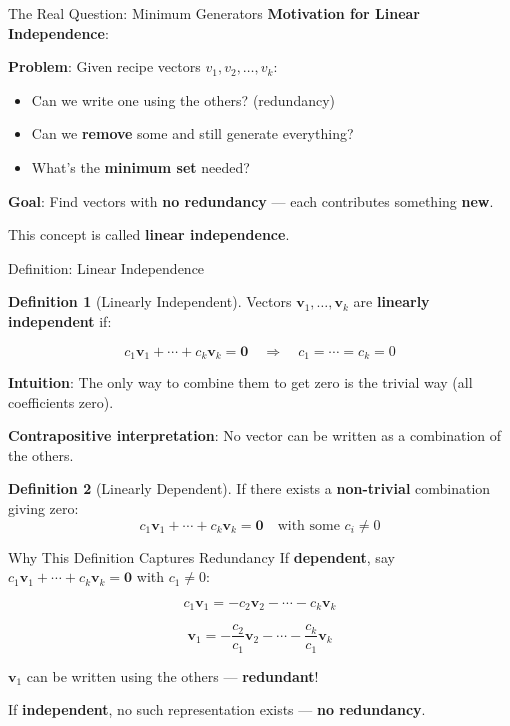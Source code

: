 \documentclass[10pt]{beamer}
\theoremstyle{definition}
\newtheorem{defi}{Definition}[section]
\newcommand{\x}[1]{\alert{\textbf{#1}}}
\begin{document}
\begin{frame}{The Real Question: Minimum Generators}
\x{Motivation for Linear Independence}:

\vfill
\textbf{Problem}: Given recipe vectors $v_1, v_2, \ldots, v_k$:
\begin{itemize}
\item Can we write one using the others? (redundancy)
\item Can we \x{remove} some and still generate everything?
\item What's the \x{minimum set} needed?
\end{itemize}

\vfill
\textbf{Goal}: Find vectors with \x{no redundancy} — each contributes something \x{new}.

\vfill
This concept is called \x{linear independence}.
\end{frame}

\begin{frame}{Definition: Linear Independence}
\begin{defi}[Linearly Independent]
Vectors $\mathbf{v}_1, \ldots, \mathbf{v}_k$ are \x{linearly independent} if:

$$c_1\mathbf{v}_1 + \cdots + c_k\mathbf{v}_k = \mathbf{0} \quad \Rightarrow \quad c_1 = \cdots = c_k = 0$$
\end{defi}

\vfill
\x{Intuition}: The only way to combine them to get zero is the trivial way (all coefficients zero).

\vfill
\x{Contrapositive interpretation}: No vector can be written as a combination of the others.

\vfill
\begin{defi}[Linearly Dependent]
If there exists a \x{non-trivial} combination giving zero:
$$c_1\mathbf{v}_1 + \cdots + c_k\mathbf{v}_k = \mathbf{0} \quad \text{with some } c_i \neq 0$$
\end{defi}
\end{frame}

\begin{frame}{Why This Definition Captures Redundancy}
If \x{dependent}, say $c_1\mathbf{v}_1 + \cdots + c_k\mathbf{v}_k = \mathbf{0}$ with $c_1 \neq 0$:

$$c_1\mathbf{v}_1 = -c_2\mathbf{v}_2 - \cdots - c_k\mathbf{v}_k$$

$$\mathbf{v}_1 = -\frac{c_2}{c_1}\mathbf{v}_2 - \cdots - \frac{c_k}{c_1}\mathbf{v}_k$$

\vfill
$\mathbf{v}_1$ can be written using the others — \x{redundant}!

\vfill
If \x{independent}, no such representation exists — \x{no redundancy}.
\end{frame}
\end{document}
